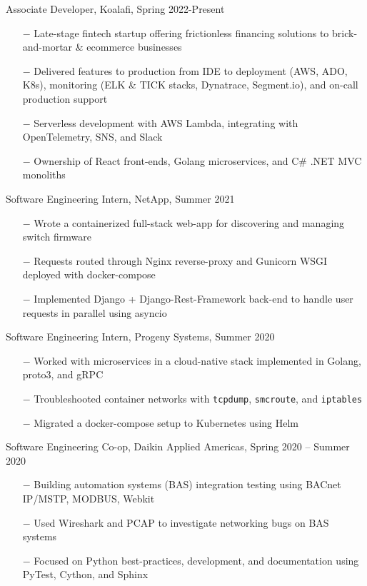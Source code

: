 \documentclass{article}
\newcommand{\code}[1]{\texttt{#1}} %
\begin{document}
{\setlength{\leftskip}{15pt}

{\selectfont Associate Developer, Koalafi, Spring 2022-Present}
\vspace{-5pt}
\begin{itemize}
	\setlength{\leftskip}{15pt}
	\setlength\itemsep{-0.5em}
    \item[$-$] Late-stage fintech startup offering frictionless financing solutions to brick-and-mortar \& ecommerce businesses
    \item[$-$] Delivered features to production from IDE to deployment (AWS, ADO, K8s), monitoring (ELK \& TICK stacks, Dynatrace, Segment.io), and on-call production support
    \item[$-$] Serverless development with AWS Lambda, integrating with OpenTelemetry, SNS, and Slack
	\item[$-$] Ownership of React front-ends, Golang microservices, and C\# .NET MVC monoliths
\end{itemize}

{\selectfont Software Engineering Intern, NetApp, Summer 2021}
\vspace{-5pt}
\begin{itemize}
	\setlength{\leftskip}{15pt}
	\setlength\itemsep{-0.5em}
	\item[$-$] Wrote a containerized full-stack web-app for discovering and managing switch firmware
	\item[$-$] Requests routed through Nginx reverse-proxy and Gunicorn WSGI deployed with docker-compose
	\item[$-$] Implemented Django + Django-Rest-Framework back-end to handle user requests in parallel using asyncio
\end{itemize}


{\selectfont Software Engineering Intern, Progeny Systems, Summer 2020}
\vspace{-5pt}
\begin{itemize}
	\setlength{\leftskip}{15pt}
	\setlength\itemsep{-0.5em}
	\item[$-$] Worked with microservices in a cloud-native stack implemented in Golang, proto3, and gRPC 
	\item[$-$] Troubleshooted container networks with \code{tcpdump}, \code{smcroute}, and \code{iptables}
	\item[$-$] Migrated a docker-compose setup to Kubernetes using Helm
\end{itemize}


{\selectfont Software Engineering Co-op, Daikin Applied Americas, Spring 2020 – Summer 2020}
\vspace{-5pt}
\begin{itemize}
	\setlength{\leftskip}{15pt}
	\setlength\itemsep{-0.5em}
	\item[$-$] Building automation systems (BAS) integration testing using BACnet IP/MSTP, MODBUS, Webkit 
	\item[$-$] Used Wireshark and PCAP to investigate networking bugs on BAS systems
	\item[$-$] Focused on Python best-practices, development, and documentation using PyTest, Cython, and Sphinx
\end{itemize}

}
\end{document}
